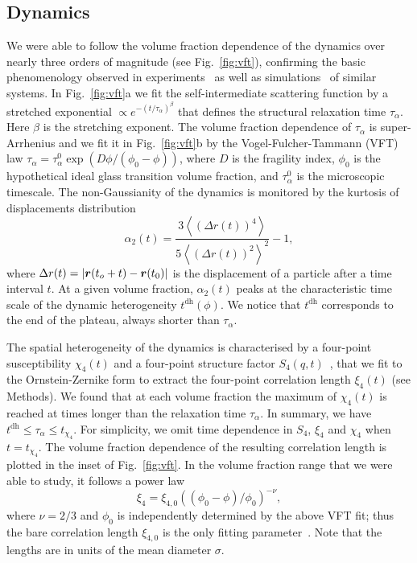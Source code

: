 \subsection*{Dynamics}

We were able to follow the volume fraction dependence of the dynamics over nearly three orders of magnitude (see Fig.~\ref{fig:vft}), confirming the basic phenomenology observed in experiments~\citep{pusey1987ogt, kegel2000swe, weeks2000, BerthierR} as well as simulations~\citep{tanaka2010critical} of similar systems. In Fig.~\ref{fig:vft}a we fit the self-intermediate scattering function by a stretched exponential $\propto e^{-(t/\tau_\alpha)^\beta}$ that defines the structural relaxation time $\tau_\alpha$. 
Here $\beta$ is the stretching exponent. The volume fraction dependence of $\tau_\alpha$ is super-Arrhenius and we fit it in Fig.~\ref{fig:vft}b by the Vogel-Fulcher-Tammann (VFT) law $\tau_\alpha=\tau_\alpha^0 \exp(D\phi/(\phi_0-\phi))$, where $D$ is the fragility index, $\phi_0$ is the hypothetical ideal glass transition volume fraction, and $\tau_\alpha^0$ is the microscopic timescale. The non-Gaussianity of the dynamics is monitored by the kurtosis of displacements distribution 
\begin{equation}
	\alpha_2(t) = \frac{3 \left\langle {(\Delta r(t))^4} \right\rangle}{5 {\left\langle {(\Delta r(t))^2} \right\rangle}^2}-1, 
	\label{eq:ng}
\end{equation}
where $\Delta r(t)= |\mbox{\boldmath$r$}(t_o+t)- \mbox{\boldmath$r$}(t_0)|$ is the displacement of
a particle after a time interval $t$. 
At a given volume fraction, $\alpha_2(t)$ peaks at the characteristic time scale of the dynamic heterogeneity $t^\text{dh}(\phi)$. We notice that $t^\text{dh}$ corresponds to the end of the plateau, always shorter than $\tau_\alpha$.

The spatial heterogeneity of the dynamics is characterised by a four-point susceptibility $\chi_4(t)$ and a four-point structure factor $S_4(q,t)$~\cite{Flenner2011}, that we fit to the Ornstein-Zernike form to extract the four-point correlation length $\xi_4(t)$ (see Methods). We found that at each volume fraction the maximum of $\chi_4(t)$ is reached at times longer than the relaxation time $\tau_\alpha$. In summary, we have
$t^\text{dh} \leq \tau_\alpha \leq t_{\chi_4}$.
For simplicity, we omit time dependence in $S_4$, $\xi_4$ and $\chi_4$ when $t=t_{\chi_4}$. The volume fraction dependence of the resulting correlation length is plotted in the inset of Fig.~\ref{fig:vft}. In the volume fraction range that we were able to study, it follows a power law
\begin{equation}
\xi_{4} =\xi_{4,0} ((\phi_0-\phi)/\phi_0)^{-\nu},
\label{eq:xi4ofphi}
\end{equation}
where $\nu=2/3$ and $\phi_0$ is independently determined by the above VFT fit; thus the bare correlation length $\xi_{4,0}$ is the only fitting parameter~\citep{tanaka2010critical}. Note that the lengths are in units of the mean diameter $\sigma$. 


